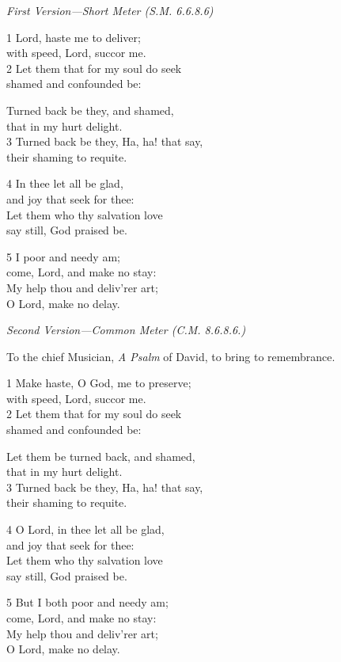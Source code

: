 \emph{First Version---Short Meter (S.M. 6.6.8.6)}

1 Lord, haste me to deliver;\\
with speed, Lord, succor me.\\
2 Let them that for my soul do seek\\
shamed and confounded be:

Turned back be they, and shamed,\\
that in my hurt delight.\\
3 Turned back be they, Ha, ha! that say,\\
their shaming to requite.

4 In thee let all be glad,\\
and joy that seek for thee:\\
Let them who thy salvation love\\
say still, God praised be.

5 I poor and needy am;\\
come, Lord, and make no stay:\\
My help thou and deliv’rer art;\\
O Lord, make no delay.

\emph{Second Version---Common Meter (C.M. 8.6.8.6.)}

To the chief Musician,
\emph{A Psalm} of David, to bring to remembrance.

1 Make haste, O God, me to preserve;\\
with speed, Lord, succor me.\\
2 Let them that for my soul do seek\\
shamed and confounded be:

Let them be turned back, and shamed,\\
that in my hurt delight.\\
3 Turned back be they, Ha, ha! that say,\\
their shaming to requite.

4 O Lord, in thee let all be glad,\\
and joy that seek for thee:\\
Let them who thy salvation love\\
say still, God praised be.

5 But I both poor and needy am;\\
come, Lord, and make no stay:\\
My help thou and deliv’rer art;\\
O Lord, make no delay.

\begin{center}
\quad{}\quad{}
\end{center}
